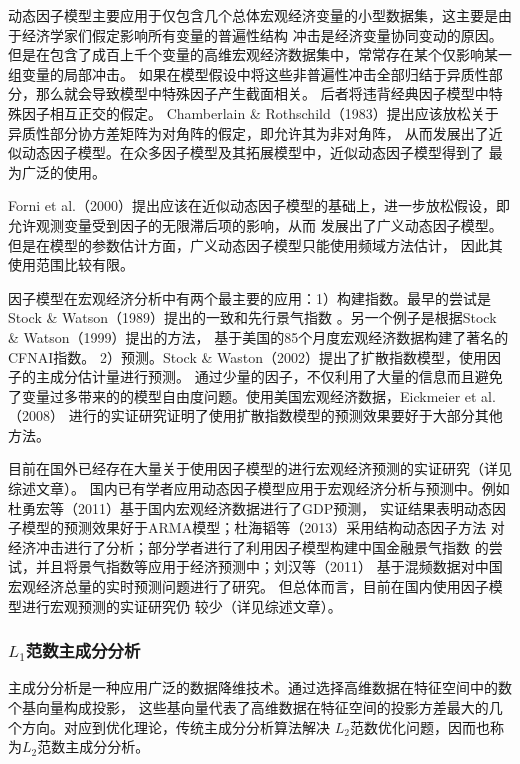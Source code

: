 动态因子模型主要应用于仅包含几个总体宏观经济变量的小型数据集，这主要是由于经济学家们假定影响所有变量的普遍性结构
冲击是经济变量协同变动的原因。但是在包含了成百上千个变量的高维宏观经济数据集中，常常存在某个仅影响某一组变量的局部冲击。
如果在模型假设中将这些非普遍性冲击全部归结于异质性部分，那么就会导致模型中特殊因子产生截面相关。
后者将违背经典因子模型中特殊因子相互正交的假定。
Chamberlain \& Rothschild（1983）提出应该放松关于异质性部分协方差矩阵为对角阵的假定，即允许其为非对角阵，
从而发展出了近似动态因子模型\cite{chamberlain1982arbitrage}。在众多因子模型及其拓展模型中，近似动态因子模型得到了
最为广泛的使用。

Forni et al.（2000）提出应该在近似动态因子模型的基础上，进一步放松假设，即允许观测变量受到因子的无限滞后项的影响，从而
发展出了广义动态因子模型\cite{forni2000generalized}。但是在模型的参数估计方面，广义动态因子模型只能使用频域方法估计，
因此其使用范围比较有限。

因子模型在宏观经济分析中有两个最主要的应用：1）构建指数。最早的尝试是Stock \& Watson（1989）提出的一致和先行景气指数
\cite{stock1989new}。另一个例子是根据Stock \& Watson（1999）提出的方法\cite{chan1999dynamic}，
基于美国的85个月度宏观经济数据构建了著名的CFNAI指数。
2）预测。Stock \& Waston（2002）提出了扩散指数模型\cite{stock2002macroeconomic}，使用因子的主成分估计量进行预测。
通过少量的因子，不仅利用了大量的信息而且避免了变量过多带来的的模型自由度问题。使用美国宏观经济数据，Eickmeier et al.（2008）
进行的实证研究\cite{eickmeier2008successful}证明了使用扩散指数模型的预测效果要好于大部分其他方法。

目前在国外已经存在大量关于使用因子模型的进行宏观经济预测的实证研究（详见综述文章\cite{luciani2014large}）。
国内已有学者应用动态因子模型应用于宏观经济分析与预测中。例如杜勇宏等（2011）基于国内宏观经济数据进行了GDP预测，
实证结果表明动态因子模型的预测效果好于ARMA模型\cite{杜勇宏2011动态因子模型与}；杜海韬等（2013）采用结构动态因子方法
对经济冲击进行了分析\cite{杜海韬2013部门价格动态}；部分学者进行了利用因子模型构建中国金融景气指数\cite{韩艾2010广义动态因子模型在景气指数构建中的应用}
的尝试，并且将景气指数等应用于经济预测中\cite{何问陶2007我国宏观经济先行指标体系及对经济预测实证研究}；刘汉等（2011）
基于混频数据对中国宏观经济总量的实时预测问题进行了研究\cite{刘汉2011中国宏观经济总量的实时预报与短期预测}。
但总体而言，目前在国内使用因子模型进行宏观预测的实证研究仍
较少（详见综述文章\cite{高华川2015动态因子模型及其应用研究综述}）。

\subsubsection{$L_1$范数主成分分析}
主成分分析是一种应用广泛的数据降维技术。通过选择高维数据在特征空间中的数个基向量构成投影，
这些基向量代表了高维数据在特征空间的投影方差最大的几个方向。对应到优化理论，传统主成分分析算法解决
$L_2$范数优化问题，因而也称为$L_2$范数主成分分析。

